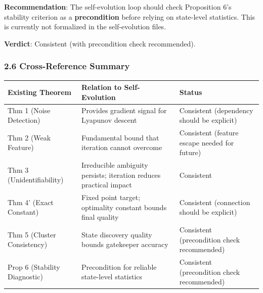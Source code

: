 \documentclass[
  12pt,
]{article}
\begin{document}
\textbf{Recommendation}: The self-evolution loop should check
Proposition 6's stability criterion as a \textbf{precondition} before
relying on state-level statistics. This is currently not formalized in
the self-evolution files.

\textbf{Verdict}: Consistent (with precondition check recommended).

\subsubsection{2.6 Cross-Reference
Summary}\label{cross-reference-summary}

\begin{longtable}[]{@{}
  >{\raggedright\arraybackslash}p{}
  >{\raggedright\arraybackslash}p{}
  >{\raggedright\arraybackslash}p{}@{}}
\toprule\noalign{}
\begin{minipage}[b]{\linewidth}\raggedright
Existing Theorem
\end{minipage} & \begin{minipage}[b]{\linewidth}\raggedright
Relation to Self-Evolution
\end{minipage} & \begin{minipage}[b]{\linewidth}\raggedright
Status
\end{minipage} \\
\midrule\noalign{}
\endhead
\bottomrule\noalign{}
\endlastfoot
Thm 1 (Noise Detection) & Provides gradient signal for Lyapunov descent
& Consistent (dependency should be explicit) \\
Thm 2 (Weak Feature) & Fundamental bound that iteration cannot overcome
& Consistent (feature escape needed for future) \\
Thm 3 (Unidentifiability) & Irreducible ambiguity persists; iteration
reduces practical impact & Consistent \\
Thm 4' (Exact Constant) & Fixed point target; optimality constant bounds
final quality & Consistent (connection should be explicit) \\
Thm 5 (Cluster Consistency) & State discovery quality bounds gatekeeper
accuracy & Consistent (precondition check recommended) \\
Prop 6 (Stability Diagnostic) & Precondition for reliable state-level
statistics & Consistent (precondition check recommended) \\
\end{longtable}
\end{document}
